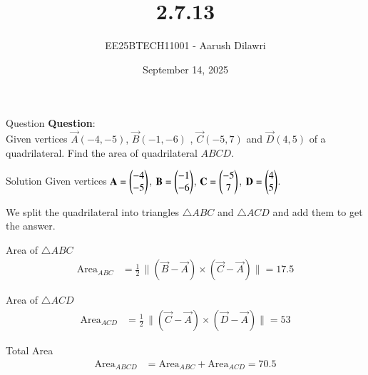 \documentclass{beamer}
\title{2.7.13}
\date{September 14, 2025}
\author{EE25BTECH11001 - Aarush Dilawri}
\begin{document}
\begin{frame}
\titlepage
\end{frame}

\begin{frame}{Question}
\textbf{Question}:\\
Given vertices $\vec{A}(-4,-5)$, $\vec{B}(-1,-6)$ , $\vec{C}(-5,7)$ and $\vec{D}(4,5)$ of a quadrilateral.  
Find the area of quadrilateral $ABCD$.
\end{frame}

\begin{frame}{Solution}
Given vertices $\mathbf{A}=\begin{pmatrix}-4\\-5\end{pmatrix}$, $\mathbf{B}=\begin{pmatrix}-1\\-6\end{pmatrix}$,  
$\mathbf{C}=\begin{pmatrix}-5\\7\end{pmatrix}$, $\mathbf{D}=\begin{pmatrix}4\\5\end{pmatrix}$.  

We split the quadrilateral into triangles $\triangle ABC$ and $\triangle ACD$  
and add them to get the answer.
\end{frame}

\begin{frame}{Area of $\triangle ABC$}
\begin{align}
\text{Area}_{ABC}
&= \tfrac{1}{2}\,\big\lVert (\vec{B}-\vec{A}) \times (\vec{C}-\vec{A}) \big\rVert = 17.5
\end{align}
\end{frame}

\begin{frame}{Area of $\triangle ACD$}
\begin{align}
\text{Area}_{ACD}
&= \tfrac{1}{2}\,\big\lVert (\vec{C}-\vec{A}) \times (\vec{D}-\vec{A}) \big\rVert = 53
\end{align}
\end{frame}

\begin{frame}{Total Area}
\begin{align}
\text{Area}_{ABCD} &= \text{Area}_{ABC} + \text{Area}_{ACD} = 70.5
\end{align}
\end{frame}
\end{document}
